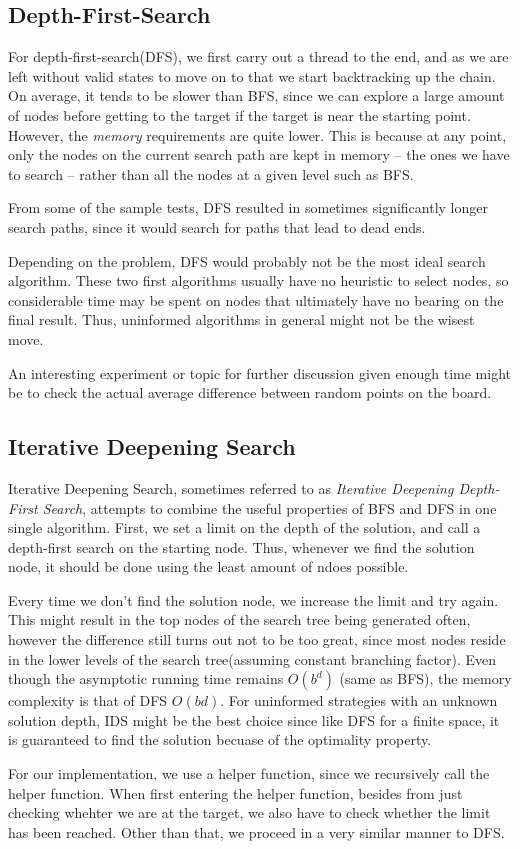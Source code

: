 \documentclass{article}
\begin{document}
\subsection{Depth-First-Search}
	For depth-first-search(DFS), we first carry out a thread to the end, and as we are left without valid 
	states to move on to that we start backtracking up the chain. On average, it tends to be slower than
	BFS, since we can explore a large amount of nodes before getting to the target if the target is near
	the starting point. However, the \textit{memory} requirements are quite lower. This is because at any 
	point, only the nodes on the current search path are kept in memory -- the ones we have to search --
	rather than all the nodes at a given level such as BFS. 

	
	From some of the sample tests, DFS resulted in sometimes significantly longer search paths,
	since it would search for paths that lead to dead ends.

	Depending on the problem, DFS would probably not be the most ideal search algorithm. These two first
	algorithms usually have no heuristic to select nodes, so considerable time may be spent on nodes
	that ultimately have no bearing on the final result. Thus, uninformed algorithms in general might
	not be the wisest move. 
	
	An interesting experiment or topic for further discussion given enough time might be 
	to check the actual average difference between random points on the board. 
\subsection{Iterative Deepening Search}
	Iterative Deepening Search, sometimes referred to as \textit{Iterative Deepening Depth-First Search},
	attempts to combine the useful properties of BFS and DFS in one single algorithm. First, we set a limit
	on the depth of the solution, and call a depth-first search on the starting node. Thus, whenever we find
	the solution node, it should be done using the least amount of ndoes possible.

	Every time we don't find the solution node, we increase the limit and try again. This might result
	in the top nodes of the search tree being generated often, however the difference still turns out not
	to be too great, since most nodes reside in the lower levels of the search tree(assuming constant 
	branching factor). Even though the 
	asymptotic running time remains $O(b^{d})$ (same as BFS), the memory complexity is that of DFS $O(bd)$.
	For uninformed strategies with an unknown solution depth, IDS might be the best choice since like DFS
	for a finite space, it is guaranteed to find the solution becuase of the optimality property.

	For our implementation, we use a helper function, since we recursively call the helper function. When first
	entering the helper function, besides from just checking whehter we are at the target, we also have to check
	whether the limit has been reached. Other than that, we proceed in a very similar manner to DFS.
\end{document}
